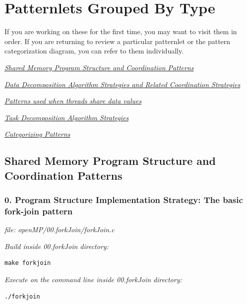 \documentclass[letterpaper,10pt,openany,oneside]{sphinxmanual}
\begin{document}
\section{Patternlets Grouped By Type}
\label{SharedMemory/OpenMP_Patternlets:patternlets-grouped-by-type}
If you are working on these for the first time, you may want to visit them in order.  If you are returning to review a particular patternlet or the pattern categorization diagram, you can refer to them individually.

{\hyperref[SharedMemory/ProgStructure_Barrier::doc]{\emph{Shared Memory Program Structure and Coordination Patterns}}}

{\hyperref[SharedMemory/DataDecomp_Reduction::doc]{\emph{Data Decomposition Algorithm Strategies and Related Coordination Strategies}}}

{\hyperref[SharedMemory/MutualExclusion::doc]{\emph{Patterns used when threads share data values}}}

{\hyperref[SharedMemory/TaskDecomp::doc]{\emph{Task Decomposition Algorithm Strategies}}}

{\hyperref[SharedMemory/patterns_diagram::doc]{\emph{Categorizing Patterns}}}


\subsection{Shared Memory Program Structure and Coordination Patterns}
\label{SharedMemory/ProgStructure_Barrier:shared-memory-program-structure-and-coordination-patterns}\label{SharedMemory/ProgStructure_Barrier::doc}

\subsubsection{0. Program Structure Implementation Strategy: The basic fork-join pattern}
\label{SharedMemory/ProgStructure_Barrier:program-structure-implementation-strategy-the-basic-fork-join-pattern}
\emph{file: openMP/00.forkJoin/forkJoin.c}

\emph{Build inside 00.forkJoin directory:}

\begin{Verbatim}[commandchars=\\\{\}]
make forkjoin
\end{Verbatim}

\emph{Execute on the command line inside 00.forkJoin directory:}

\begin{Verbatim}[commandchars=\\\{\}]
./forkjoin
\end{Verbatim}
\end{document}
